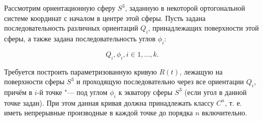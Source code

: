 Рассмотрим ориентационную сферу $S^3$, заданную в некоторой ортогональной сис\-теме координат с началом в центре этой
сферы. Пусть задана последовательность различных ориентаций $Q_i$, принадлежащих поверхности этой сферы, а также задана
последовательность углов $\phi_i$:

$${Q_i}, {\phi_i}, i \in {1, \dots, k}.$$

Требуется построить параметризованную кривую $R(t)$, лежащую на поверхности сферы $S^3$ и проходящую
последовательно через все ориентации $Q_i$, причём в $i$-й точке "--- под углом $\phi_i$ к экватору сферы $S^3$ (если
угол в данной точке задан). При этом данная кривая должна принадлежать классу $C^n$, т. е. иметь непрерывные
производные в каждой точке до порядка $n$ включительно.
